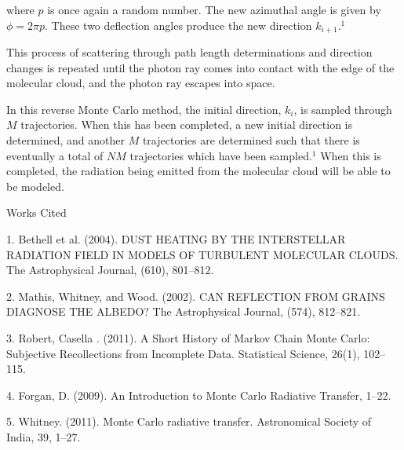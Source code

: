 \documentclass[a4paper, 10pt]{article}
\begin{document}
\noindent where $p$ is once again a random number. The new azimuthal angle is given by $\phi=2\pi p$. These two deflection angles produce the new direction $k_{i+1}$.$^1$ 

This process of scattering through path length determinations and direction changes is repeated until the photon ray comes into contact with the edge of the molecular cloud, and the photon ray escapes into space. 

In this reverse Monte Carlo method, the initial direction, $k_i$, is sampled through $M$ trajectories. When this has been completed, a new initial direction is determined, and another $M$ trajectories are determined such that there is eventually a total of $NM$ trajectories which have been sampled.$^1$ When this is completed, the radiation being emitted from the molecular cloud will be able to be modeled. 

\pagebreak 

\begin{center} 
Works Cited
\end{center}

1. Bethell et al. (2004). DUST HEATING BY THE INTERSTELLAR RADIATION FIELD IN MODELS OF TURBULENT MOLECULAR CLOUDS. The Astrophysical Journal, (610), 801–812.

2. Mathis, Whitney, and Wood. (2002). CAN REFLECTION FROM GRAINS DIAGNOSE THE ALBEDO? The Astrophysical Journal, (574), 812–821.

3.  Robert, Casella . (2011). A Short History of Markov Chain Monte Carlo: Subjective Recollections from Incomplete Data. Statistical Science, 26(1), 102–115.

4. Forgan, D. (2009). An Introduction to Monte Carlo Radiative Transfer, 1–22.

5. Whitney. (2011). Monte Carlo radiative transfer. Astronomical Society of India, 39, 1–27.
\end{document}
